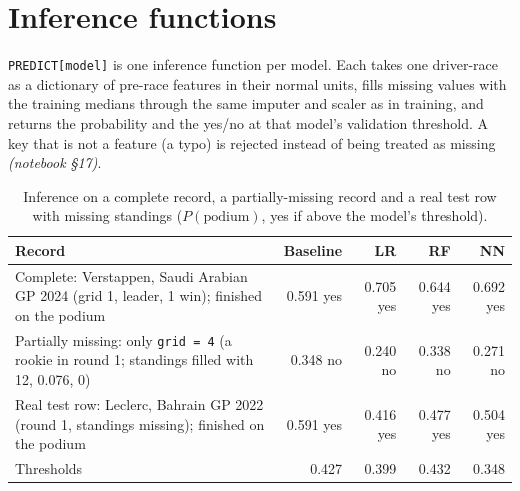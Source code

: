 \documentclass[11pt,a4paper]{article}
\newcommand{\code}[1]{\texttt{#1}}
\newcommand{\nb}[1]{\textit{(notebook \S#1)}}
\begin{document}
\section{Inference functions}

\code{PREDICT[model]} is one inference function per model. Each takes one driver-race as a dictionary of pre-race features in their normal units, fills missing values with the training medians through the same imputer and scaler as in training, and returns the probability and the yes/no at that model's validation threshold. A key that is not a feature (a typo) is rejected instead of being treated as missing \nb{17}.

\begin{table}[H]
\centering\small
\caption{Inference on a complete record, a partially-missing record and a real test row with missing standings ($P(\text{podium})$, yes if above the model's threshold).}
\label{tab:inference}
\begin{tabularx}{\linewidth}{>{\raggedright\arraybackslash}Xrrrr}
\toprule
Record & Baseline & LR & RF & NN \\
\midrule
Complete: Verstappen, Saudi Arabian GP 2024 (grid 1, leader, 1 win); finished on the podium & 0.591 yes & 0.705 yes & 0.644 yes & 0.692 yes \\
Partially missing: only \code{grid = 4} (a rookie in round 1; standings filled with 12, 0.076, 0) & 0.348 no & 0.240 no & 0.338 no & 0.271 no \\
Real test row: Leclerc, Bahrain GP 2022 (round 1, standings missing); finished on the podium & 0.591 yes & 0.416 yes & 0.477 yes & 0.504 yes \\
\midrule
Thresholds & 0.427 & 0.399 & 0.432 & 0.348 \\
\bottomrule
\end{tabularx}
\end{table}

\end{document}
